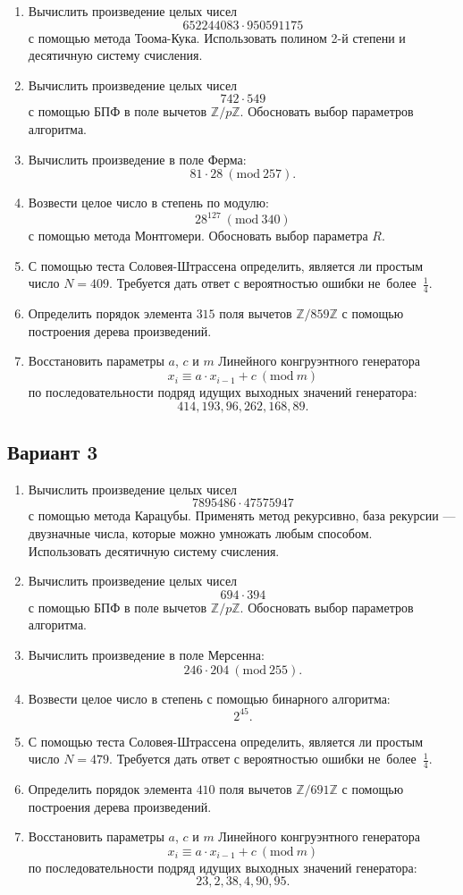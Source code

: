 \documentclass[14pt]{extarticle}
\begin{document}
	\begin{enumerate}
		\item Вычислить произведение целых чисел \[652244083 \cdot 950591175\] с помощью метода Тоома-Кука. Использовать полином 2-й степени и десятичную систему счисления.
		\item Вычислить произведение целых чисел \[742 \cdot 549\] с помощью БПФ в поле вычетов $\mathbb{Z}/p\mathbb{Z}$. Обосновать выбор параметров алгоритма.
		\item Вычислить произведение в поле Ферма: \[81 \cdot 28\ (\textrm{mod}\ 257).\]
		\item Возвести целое число в степень по модулю: \[28^{127}\ (\textrm{mod}\ 340)\] с помощью метода Монтгомери. Обосновать выбор параметра $R$.
		\item С помощью теста Соловея-Штрассена определить, является ли простым число $N = 409$. Требуется дать ответ с вероятностью ошибки не~более~$\frac14$.
		\item Определить порядок элемента $315$ поля вычетов $\mathbb{Z}/859\mathbb{Z}$ с помощью построения дерева произведений.
		\item Восстановить параметры $a$, $c$ и $m$ Линейного конгруэнтного генератора \[x_i \equiv a \cdot x_{i-1} + c\ (\textrm{mod}\ m)\] по последовательности подряд идущих выходных значений генератора: \[414, 193, 96, 262, 168, 89.\]
	\end{enumerate}
\clearpage	\subsection{Вариант 3}
	\begin{enumerate}
		\item Вычислить произведение целых чисел \[7895486 \cdot 47575947\] с помощью метода Карацубы. Применять метод рекурсивно, база рекурсии — двузначные числа, которые можно умножать любым способом.\\ Использовать десятичную систему счисления.
		\item Вычислить произведение целых чисел \[694 \cdot 394\] с помощью БПФ в поле вычетов $\mathbb{Z}/p\mathbb{Z}$. Обосновать выбор параметров алгоритма.
		\item Вычислить произведение в поле Мерсенна: \[246 \cdot 204\ (\textrm{mod}\ 255).\]
		\item Возвести целое число в степень с помощью бинарного алгоритма: \[2^{45}.\]
		\item С помощью теста Соловея-Штрассена определить, является ли простым число $N = 479$. Требуется дать ответ с вероятностью ошибки не~более~$\frac14$.
		\item Определить порядок элемента $410$ поля вычетов $\mathbb{Z}/691\mathbb{Z}$ с помощью построения дерева произведений.
		\item Восстановить параметры $a$, $c$ и $m$ Линейного конгруэнтного генератора \[x_i \equiv a \cdot x_{i-1} + c\ (\textrm{mod}\ m)\] по последовательности подряд идущих выходных значений генератора: \[23, 2, 38, 4, 90, 95.\]
	\end{enumerate}
\end{document}
